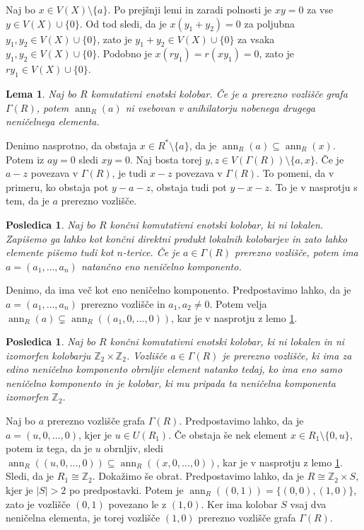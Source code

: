 \documentclass[a4paper, 12pt]{amsart}
\theoremstyle{definition} %
\theoremstyle{plain} %
\newtheorem{lema}[definicija]{Lema}
\newtheorem{posledica}[definicija]{Posledica}
\newcommand{\Z}{\mathbb Z}
\DeclareMathOperator{\ann}{ann}
\begin{document}
\proof
Naj bo $x\in V(X)\setminus\{a\}$. Po prejšnji lemi in zaradi polnosti je $xy=0$ za vse $y\in V(X)\cup\{0\}$. Od tod sledi, da je $x(y_1 + y_2) = 0$ za poljubna $y_1,y_2 \in V(X)\cup \{0\}$, zato je $y_1 + y_2 \in V(X) \cup\{0\}$ za vsaka $y_1,y_2\in V(X)\cup\{0\}$. Podobno je $x(ry_1) = r(xy_1 ) =0$, zato je $ry_1\in V(X) \cup\{0\}$.
\endproof

\begin{lema}
\label{cutVertexMaxAnn}
Naj bo $R$ komutativni enotski kolobar. Če je $a$ prerezno vozlišče grafa $\Gamma(R)$, potem $\ann_R(a)$ ni vsebovan v anihilatorju nobenega drugega neničelnega elementa.
\end{lema}

\proof
Denimo nasprotno, da obstaja $x\in R^*\setminus\{a\}$, da je $\ann_R(a) \subseteq \ann_R(x)$. Potem iz $ay = 0$ sledi $xy = 0$. Naj bosta torej $y,z \in V(\Gamma(R)) \setminus \{a,x\}$. Če je $a-z$ povezava v $\Gamma(R)$, je tudi $x-z$ povezava v $\Gamma(R)$. To  pomeni, da v primeru, ko obstaja pot $y-a-z$, obstaja tudi pot $y-x-z$. To je v nasprotju s tem, da je $a$ prerezno vozlišče.
\endproof

\begin{posledica}
\label{cutVertexOneNonzeroComponent}
Naj bo $R$ končni komutativni enotski kolobar, ki ni lokalen. Zapišemo ga lahko kot končni direktni produkt lokalnih kolobarjev in zato lahko elemente pišemo tudi kot $n$-terice. Če je $a\in \Gamma(R)$ prerezno vozlišče, potem ima $a= (a_1,\dots,a_n)$ natančno eno neničelno komponento.
\end{posledica}

\proof
Denimo, da ima več kot eno neničelno komponento. Predpostavimo lahko, da je $a=(a_1,\dots,a_n)$ prerezno vozlišče in $a_1,a_2 \neq 0$. Potem velja $\ann_R(a) \subsetneq \ann_R((a_1,0,\dots,0))$, kar je v nasprotju z lemo \ref{cutVertexMaxAnn}.
\endproof

\begin{posledica}
\label{cutVertexUnitNonzeroComponent}
Naj bo $R$ končni komutativni enotski kolobar, ki ni lokalen in ni izomorfen kolobarju $\Z_2 \times \Z_2$. Vozlišče $a\in \Gamma(R)$ je prerezno vozlišče, ki ima za edino neničelno komponento obrnljiv element natanko tedaj, ko ima eno samo neničelno komponento in je kolobar, ki mu pripada ta neničelna komponenta izomorfen $\Z_2$.
\end{posledica}

\proof
Naj bo $a$ prerezno vozlišče grafa $\Gamma(R)$. Predpostavimo lahko, da je $a=(u,0,\dots,0)$, kjer je $u\in U(R_1)$. Če obstaja še nek element $x\in R_1 \setminus\{0,u\}$, potem iz tega, da je $u$ obrnljiv, sledi $\ann_R((u,0,\dots,0)) \subseteq \ann_R((x,0,\dots,0))$, kar je v nasprotju z lemo \ref{cutVertexMaxAnn}. Sledi, da je $R_1\cong \Z_2$.
Dokažimo še obrat. Predpostavimo lahko, da je $R\cong \Z_2 \times S$, kjer je $|S|>2$ po predpostavki. Potem je $\ann_R((0,1)) = \{(0,0),(1,0)\}$, zato je vozlišče $(0,1)$ povezano le z $(1,0)$. Ker ima kolobar $S$ vsaj dva neničelna elementa, je torej vozlišče $(1,0)$ prerezno vozlišče grafa $\Gamma(R)$. 
\endproof
\end{document}
